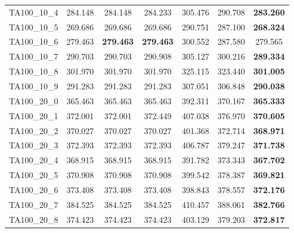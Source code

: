 \begin{tabular}{cc|cc|ccc}
TA100\_10\_4       & 284.148          & 284.148          & 284.233          & 305.476          & 290.708          & {\bf 283.260}   \\ 
TA100\_10\_5       & 269.686          & 269.686          & 269.686          & 290.751          & 287.100          & {\bf 268.324}   \\ 
TA100\_10\_6       & 279.463          & {\bf 279.463}    & {\bf 279.463}    & 300.552          & 287.580          & 279.565         \\ 
TA100\_10\_7       & 290.703          & 290.703          & 290.908          & 305.127          & 300.216          & {\bf 289.334}   \\ 
TA100\_10\_8       & 301.970          & 301.970          & 301.970          & 325.115          & 323.440          & {\bf 301.005}   \\ 
TA100\_10\_9       & 291.283          & 291.283          & 291.283          & 307.051          & 306.848          & {\bf 290.038}   \\ 
TA100\_20\_0       & 365.463          & 365.463          & 365.463          & 392.311          & 370.167          & {\bf 365.333}   \\ 
TA100\_20\_1       & 372.001          & 372.001          & 372.449          & 407.038          & 376.970          & {\bf 370.605}   \\ 
TA100\_20\_2       & 370.027          & 370.027          & 370.027          & 401.368          & 372.714          & {\bf 368.971}   \\ 
TA100\_20\_3       & 372.393          & 372.393          & 372.393          & 406.787          & 379.247          & {\bf 371.738}   \\ 
TA100\_20\_4       & 368.915          & 368.915          & 368.915          & 391.782          & 373.343          & {\bf 367.702}   \\ 
TA100\_20\_5       & 370.908          & 370.908          & 370.908          & 399.542          & 378.387          & {\bf 369.821}   \\ 
TA100\_20\_6       & 373.408          & 373.408          & 373.408          & 398.843          & 378.557          & {\bf 372.176}   \\ 
TA100\_20\_7       & 384.525          & 384.525          & 384.525          & 410.457          & 388.061          & {\bf 382.766}   \\ 
TA100\_20\_8       & 374.423          & 374.423          & 374.423          & 403.129          & 379.203          & {\bf 372.817}   \\ 

\end{tabular}

